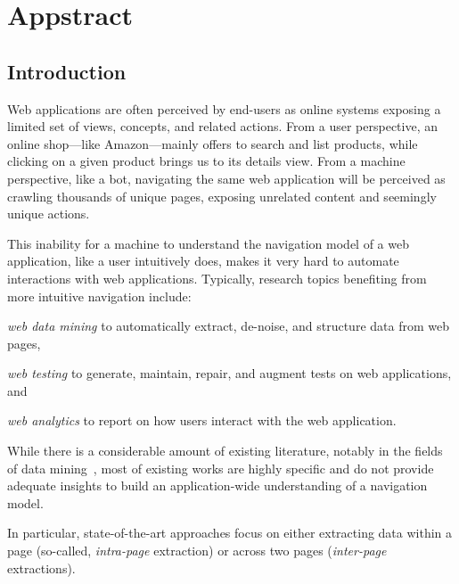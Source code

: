 \chapter{Appstract}\label{chap:appstract}
\section{Introduction}\label{appstract:sec:introduction}
Web applications are often perceived by end-users as online systems exposing a limited set of views, concepts, and related actions.
From a user perspective, an online shop---like Amazon---mainly offers to search and list products, while clicking on a given product brings us to its details view. 
From a machine perspective, like a bot, navigating the same web application will be perceived as crawling thousands of unique pages, exposing unrelated content and seemingly unique actions.

This inability for a machine to understand the navigation model of a web application, like a user intuitively does, makes it very hard to automate interactions with web applications.
Typically, research topics benefiting from more intuitive navigation include:
\begin{inparaenum}[\it (a)]
    \item \emph{web data mining} to automatically extract, de-noise, and structure data from web pages,
    \item \emph{web testing} to generate, maintain, repair, and augment tests on web applications, and
    \item \emph{web analytics} to report on how users interact with the web application.
\end{inparaenum}

While there is a considerable amount of existing literature, notably in the fields of data mining~\cite{Zhai2005WebAlignment, ArasuExtractingPages, Crescenzi2001RoadRunner:Sites, Sarawagi1996InformationExtraction, ChaudhariTemplatePages, MiaoExtractingClustering}, most of existing works are highly specific and do not provide adequate insights to build an application-wide understanding of a navigation model.

In particular, state-of-the-art approaches focus on either extracting data within a page (so-called, \emph{intra-page} extraction) or across two pages (\emph{inter-page} extractions). 

